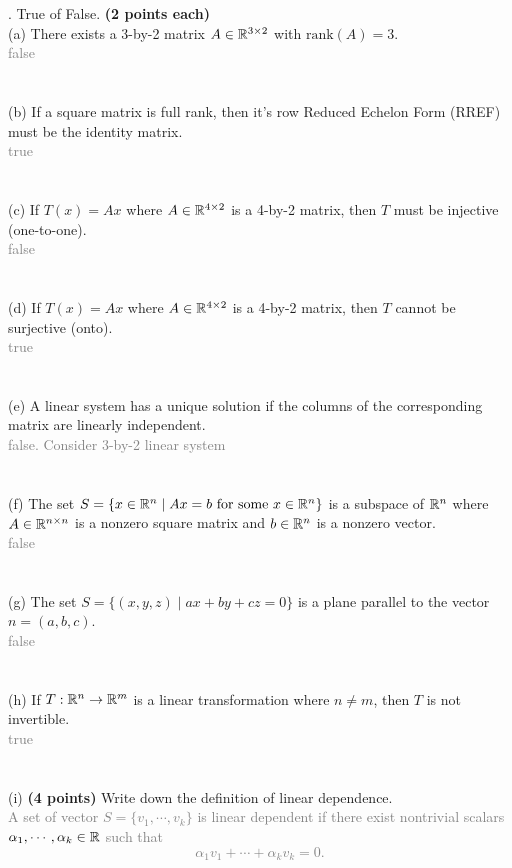 \documentclass[12pt,a4paper]{article}
\newcommand{\gray}[1]{\textcolor{gray}{#1}}
\newcommand{\ra}[1]{\ifnum #1=1\rightarrow\fi\ifnum #1=2\Rightarrow\fi\ifnum #1=3\Rrightarrow\fi\ifnum #1=4\rightrightarrows\fi\ifnum #1=5\rightleftarrows\fi\ifnum #1=6\mapsto\fi\ifnum #1=7\iffalse\fi\fi\ifnum #1=8\twoheadrightarrow\fi\ifnum #1=9\rightharpoonup\fi\ifnum #1=0\rightharpoondown\fi}
\newcommand{\x}{\times}
\def\R{\ifmmode\mathbb R\fi}
\begin{document}
\newpage
{}. True of False. \textbf{(2 points each)}\\
(a) There exists a 3-by-2 matrix $A \in \R^{3\x 2}$ with $\mbox{rank}(A) = 3$.\\
\gray{false}
\\
\\
\\
(b) If a square matrix is full rank, then it's row Reduced Echelon Form (RREF) must be the identity matrix. \\
\gray{true}
\\
\\
\\
(c) If $T(x) = Ax$ where $A \in \R^{4\x 2}$ is a 4-by-2 matrix, then $T$ must be injective (one-to-one). \\
\gray{false}
\\
\\
\\
(d) If $T(x) = Ax$ where $A \in \R^{4\x 2}$ is a 4-by-2 matrix, then $T$ cannot be surjective (onto). \\
\gray{true}
\\
\\
\\
(e) A linear system has a unique solution if the columns of the corresponding matrix are linearly independent. \\
\gray{false. Consider 3-by-2 linear system}
\\
\\
\\
(f) The set $S = \{x \in \R^n \mid Ax = b \mbox{ for some } x\in \R^n\}$ is a subspace of $\R^n$ where $A \in \R^{n\x n}$ is a nonzero square matrix and $b\in\R^n$ is a nonzero vector.  \\
\gray{false}
\\
\\
\\
(g) The set $S = \{(x, y, z) \mid ax+by+cz = 0\}$ is a plane parallel to the vector $n = (a, b, c)$. \\
\gray{false}
\\
\\
\\
(h) If $T: \R^n \ra1 \R^m$ is a linear transformation where $n \neq m$, then $T$ is not invertible. \\
\gray{true} \\
\\
\\
(i) \textbf{(4 points)} Write down the definition of linear dependence. \\
\gray{A set of vector $S = \{v_1, \cdots, v_k\}$ is linear dependent if there exist nontrivial scalars $\alpha_1, \cdots, \alpha_k \in \R$ such that 
$$ \alpha_1 v_1 + \cdots + \alpha_k v_k = 0.$$
}
\end{document}
